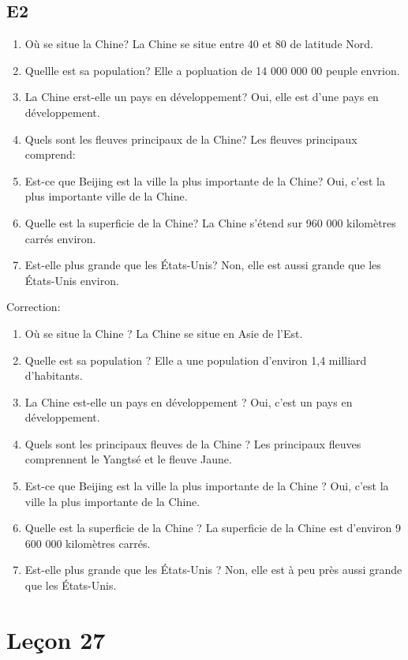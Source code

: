 \documentclass{book}
\begin{document}
    \section{E2}
        \begin{enumerate}
            \item Où se situe la Chine? La Chine se situe entre 40 et 80 de latitude Nord.
            \item Quellle est sa population? Elle a popluation de 14 000 000 00 peuple envrion.
            \item La Chine erst-elle un pays en développement? Oui, elle est d'une pays en développement.
            \item Quels sont les fleuves principaux de la Chine? Les fleuves principaux comprend:
            \item Est-ce que Beijing est la ville la plus importante de la Chine? Oui, c'est la plus importante ville de la Chine.
            \item Quelle est la superficie de la Chine? La Chine s'étend sur 960 000 kilomètres carrés environ.
            \item Est-elle plus grande que les États-Unis? Non, elle est aussi grande que les États-Unis environ.
        \end{enumerate}
        Correction:
        \begin{enumerate}
            \item Où se situe la Chine ? La Chine se situe en Asie de l'Est.
            \item Quelle est sa population ? Elle a une population d'environ 1,4 milliard d'habitants.
            \item La Chine est-elle un pays en développement ? Oui, c'est un pays en développement.
            \item Quels sont les principaux fleuves de la Chine ? Les principaux fleuves comprennent le Yangtsé et le fleuve Jaune.
            \item Est-ce que Beijing est la ville la plus importante de la Chine ? Oui, c'est la ville la plus importante de la Chine.
            \item Quelle est la superficie de la Chine ? La superficie de la Chine est d'environ 9 600 000 kilomètres carrés.
            \item Est-elle plus grande que les États-Unis ? Non, elle est à peu près aussi grande que les États-Unis.
        \end{enumerate}

\chapter{Leçon 27}
\end{document}
